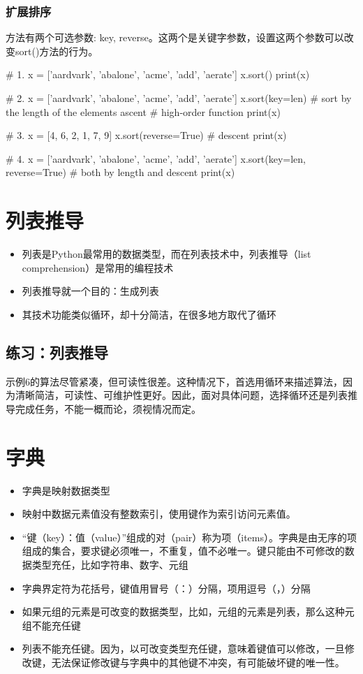 \subsubsection{扩展排序}
方法有两个可选参数: key, reverse。这两个是关键字参数，设置这两个参数可以改变sort()方法的行为。
\begin{python}
  # 1. 
x = ['aardvark', 'abalone', 'acme', 'add', 'aerate']
x.sort()  
print(x)

# 2.
x = ['aardvark', 'abalone', 'acme', 'add', 'aerate']
x.sort(key=len) # sort by the length of the elements ascent
                # high-order function
print(x)
                 
   # 3.
x = [4, 6, 2, 1, 7, 9]
x.sort(reverse=True)  # descent
print(x)

  # 4.
x = ['aardvark', 'abalone', 'acme', 'add', 'aerate']
x.sort(key=len, reverse=True)  # both by length and descent
print(x)
\end{python}
\section{列表推导}
\begin{itemize}
\item 列表是Python最常用的数据类型，而在列表技术中，列表推导（list comprehension）是常用的编程技术
\item 列表推导就一个目的：生成列表
\item 其技术功能类似循环，却十分简洁，在很多地方取代了循环
\end{itemize}
\subsection{练习：列表推导}
示例6的算法尽管紧凑，但可读性很差。这种情况下，首选用循环来描述算法，因为清晰简洁，可读性、可维护性更好。因此，面对具体问题，选择循环还是列表推导完成任务，不能一概而论，须视情况而定。

\section{字典}
\begin{itemize}
\item 字典是映射数据类型
\item 映射中数据元素值没有整数索引，使用键作为索引访问元素值。
\item “键（key）：值（value）”组成的对（pair）称为项（items）。字典是由无序的项组成的集合，要求键必须唯一，不重复，值不必唯一。键只能由不可修改的数据类型充任，比如字符串、数字、元组
\item 字典界定符为花括号{}，键值用冒号（：）分隔，项用逗号（，）分隔
\item 如果元组的元素是可改变的数据类型，比如，元组的元素是列表，那么这种元组不能充任键
\item 列表不能充任键。因为，以可改变类型充任键，意味着键值可以修改，一旦修改键，无法保证修改键与字典中的其他键不冲突，有可能破坏键的唯一性。
\end{itemize}

